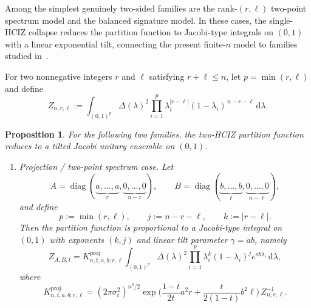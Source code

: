\documentclass[11pt,a4paper]{article}
\newtheorem{proposition}[theorem]{Proposition}
\theoremstyle{definition}\newtheorem{definition}[theorem]{Definition}
\theoremstyle{remark}\newtheorem{remark}[theorem]{Remark}
\numberwithin{equation}{section}
\DeclareMathOperator{\diag}{diag}
\newcommand{\dd}{\mathrm{d}}
\begin{document}
Among the simplest genuinely two-sided families are the rank-$(r,\ell)$
two-point spectrum model and the balanced signature model. In these cases, the single-HCIZ collapse reduces the partition function to Jacobi-type integrals on $(0,1)$ with a linear exponential tilt, connecting the present finite-$n$ model to families studied in~\cite{EdelmanSutton2008,BasorChenEhrhardt2010,ForresterWitte2002}.

For two nonnegative integers $r$ and $\ell$ satisfying $r+\ell\le n$, let
$p=\min(r,\ell)$ and define
\begin{equation} 
Z_{n,r,\ell}:=\int_{(0,1)^p} \Delta(\lambda)^2 \prod_{i=1}^{p} \lambda_i^{|r-\ell|}(1-\lambda_i)^{\,n-r-\ell}\,\dd \lambda.
\end{equation}
\begin{proposition}
\label{prop:tilted_jacobi}
For the following two families, the two-HCIZ partition function reduces to a tilted
Jacobi unitary ensemble on $(0,1)$.

\begin{enumerate}
\item[\textup{(i)}] \textup{Projection / two-point spectrum case.}
Let
\begin{equation}
A=\diag(\underbrace{a,\dots,a}_{r},\underbrace{0,\dots,0}_{n-r}),
\qquad
B=\diag(\underbrace{b,\dots,b}_{\ell},\underbrace{0,\dots,0}_{n-\ell}),
\end{equation}
and define
\begin{equation}
p:=\min(r,\ell),\qquad
j:=n-r-\ell,\qquad
k:=|r-\ell|.
\end{equation}
Then the partition function is proportional to a Jacobi-type integral on $(0,1)$
with exponents $(k,j)$ and linear tilt parameter $\gamma=ab$, namely
\begin{equation}\label{eq:proj_direct_jacobi}
Z_{A,B,t}
=
K^{\mathrm{proj}}_{n,t,a,b;r,\ell}
\int_{(0,1)^p}
\Delta(\lambda)^2
\prod_{i=1}^{p}
\lambda_i^{k}(1-\lambda_i)^j e^{ab\lambda_i}\,\dd \lambda,
\end{equation}
where
\begin{equation}\label{eq:proj_direct_jacobi_const}
K^{\mathrm{proj}}_{n,t,a,b;r,\ell}
=
(2\pi\sigma_t^2)^{n^2/2}
\exp\!\Big(\frac{1-t}{2t}a^2r+\frac{t}{2(1-t)}b^2\ell\Big)\,
Z_{n,r,\ell}^{-1}.
\end{equation}


\end{enumerate}
\end{proposition}
\end{document}
